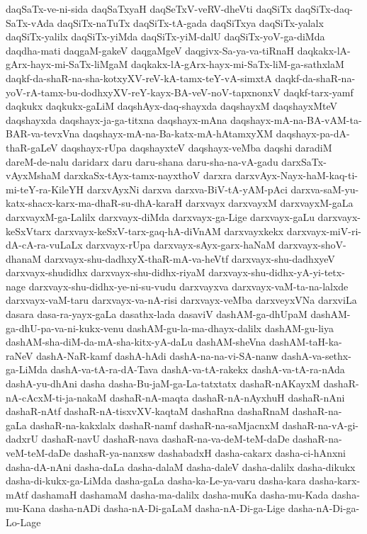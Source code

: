 {daqSaTx-ve-ni-sida
daqSaTxyaH
daqSeTxV-veRV-dheVti
daqSiTx
daqSiTx-daq-SaTx-vAda
daqSiTx-naTuTx
daqSiTx-tA-gada
daqSiTxya
daqSiTx-yalalx
daqSiTx-yalilx
daqSiTx-yiMda
daqSiTx-yiM-dalU
daqSiTx-yoV-ga-diMda
daqdha-mati
daqgaM-gakeV
daqgaMgeV
daqgivx-Sa-ya-va-tiRnaH
daqkakx-lA-gArx-hayx-mi-SaTx-liMgaM
daqkakx-lA-gArx-hayx-mi-SaTx-liM-ga-sathxlaM
daqkf-da-shaR-na-sha-kotxyXV-reV-kA-tamx-teY-vA-simxtA
daqkf-da-shaR-na-yoV-rA-tamx-bu-dodhxyXV-reY-kayx-BA-veV-noV-tapxnonxV
daqkf-tarx-yamf
daqkukx
daqkukx-gaLiM
daqshAyx-daq-shayxda
daqshayxM
daqshayxMteV
daqshayxda
daqshayx-ja-ga-titxna
daqshayx-mAna
daqshayx-mA-na-BA-vAM-ta-BAR-va-tevxVna
daqshayx-mA-na-Ba-katx-mA-hAtamxyXM
daqshayx-pa-dA-thaR-gaLeV
daqshayx-rUpa
daqshayxteV
daqshayx-veMba
daqshi
daradiM
dareM-de-nalu
daridarx
daru
daru-shana
daru-sha-na-vA-gadu
darxSaTx-vAyxMshaM
darxkaSx-tAyx-tamx-nayxthoV
darxra
darxvAyx-Nayx-haM-kaq-ti-mi-teY-ra-KileYH
darxvAyxNi
darxva
darxva-BiV-tA-yAM-pAci
darxva-saM-yu-katx-shacx-karx-ma-dhaR-su-dhA-karaH
darxvayx
darxvayxM
darxvayxM-gaLa
darxvayxM-ga-Lalilx
darxvayx-diMda
darxvayx-ga-Lige
darxvayx-gaLu
darxvayx-keSxVtarx
darxvayx-keSxV-tarx-gaq-hA-diVnAM
darxvayxkekx
darxvayx-miV-ri-dA-cA-ra-vuLaLx
darxvayx-rUpa
darxvayx-sAyx-garx-haNaM
darxvayx-shoV-dhanaM
darxvayx-shu-dadhxyX-thaR-mA-va-heVtf
darxvayx-shu-dadhxyeV
darxvayx-shudidhx
darxvayx-shu-didhx-riyaM
darxvayx-shu-didhx-yA-yi-tetx-nage
darxvayx-shu-didhx-ye-ni-su-vudu
darxvayxva
darxvayx-vaM-ta-na-lalxde
darxvayx-vaM-taru
darxvayx-va-nA-risi
darxvayx-veMba
darxveyxVNa
darxviLa
dasara
dasa-ra-yayx-gaLa
dasathx-lada
dasaviV
dashAM-ga-dhUpaM
dashAM-ga-dhU-pa-va-ni-kukx-venu
dashAM-gu-la-ma-dhayx-dalilx
dashAM-gu-liya
dashAM-sha-diM-da-mA-sha-kitx-yA-daLu
dashAM-sheVna
dashAM-taH-ka-raNeV
dashA-NaR-kamf
dashA-hAdi
dashA-na-na-vi-SA-nanw
dashA-va-sethx-ga-LiMda
dashA-va-tA-ra-dA-Tava
dashA-va-tA-rakekx
dashA-va-tA-ra-nAda
dashA-yu-dhAni
dasha
dasha-Bu-jaM-ga-La-tatxtatx
dashaR-nAKayxM
dashaR-nA-cAcxM-ti-ja-nakaM
dashaR-nA-maqta
dashaR-nA-nAyxhuH
dashaR-nAni
dashaR-nAtf
dashaR-nA-tisxvXV-kaqtaM
dashaRna
dashaRnaM
dashaR-na-gaLa
dashaR-na-kakxlalx
dashaR-namf
dashaR-na-saMjacnxM
dashaR-na-vA-gi-dadxrU
dashaR-navU
dashaR-nava
dashaR-na-va-deM-teM-daDe
dashaR-na-veM-teM-daDe
dashaR-ya-nanxsw
dashabadxH
dasha-cakarx
dasha-ci-hAnxni
dasha-dA-nAni
dasha-daLa
dasha-dalaM
dasha-daleV
dasha-dalilx
dasha-dikukx
dasha-di-kukx-ga-LiMda
dasha-gaLa
dasha-ka-Le-ya-varu
dasha-kara
dasha-karx-mAtf
dashamaH
dashamaM
dasha-ma-dalilx
dasha-muKa
dasha-mu-Kada
dasha-mu-Kana
dasha-nADi
dasha-nA-Di-gaLaM
dasha-nA-Di-ga-Lige
dasha-nA-Di-ga-Lo-Lage
}
